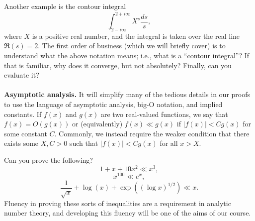 \documentclass[11pt]{amsart}
\theoremstyle{remark}
\numberwithin{theorem}{section} \numberwithin{equation}{section}
\begin{document}
Another example is the contour integral
\begin{equation} \int_{2 - i \infty}^{2 + i \infty} X^s \frac{ds}{s},
\end{equation}
where $X$ is a positive real number, and 
the integral is taken over the real line $\Re(s) = 2$. The first order of business (which we will briefly cover) 
is to understand what the above notation means; i.e., what is a ``contour integral''? If that is familiar, why does it converge,
but not absolutely? Finally, can you evaluate it?
\\
\\
{\bf Asymptotic analysis.} It will simplify many of the tedious details in our proofs to use the language of asymptotic analysis,
big-O notation, and implied constants. If $f(x)$ and $g(x)$ are two real-valued functions, we say that $f(x) = O(g(x))$ or
(equivalently) $f(x) \ll g(x)$ if $|f(x)| < C g(x)$ for some constant $C$. Commonly, we instead require the weaker condition
that there exists some $X, C > 0$ such that $|f(x)| < C g(x)$ for all $x > X$.

Can you prove the following?
\begin{equation}
1 + x + 10 x^2 \ll x^3,
\end{equation}
\begin{equation}
x^{100} \ll e^x,
\end{equation}
\begin{equation}
\frac{1}{\sqrt{x}} + \log(x) + \exp((\log x)^{1/2}) \ll x.
\end{equation}
Fluency in proving these sorts of inequalities are a requirement in analytic number theory, and developing this fluency
will be one of the aims of our course.
\end{document}
